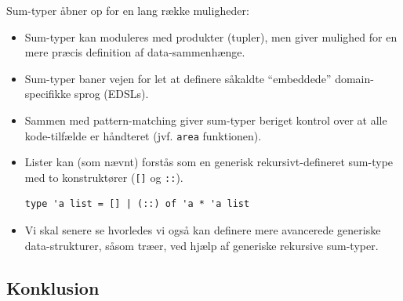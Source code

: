 \documentclass[rgb]{beamer}
\begin{document}
\begin{frame}[fragile]
\begin{footnotesize}

  \vspace{1ex}

  Sum-typer åbner op for en lang række muligheder:
  \vspace{1ex}
  \begin{itemize}
  \item Sum-typer kan moduleres med produkter (tupler), men giver
    mulighed for en mere præcis definition af data-sammenhænge.
  \vspace{1ex}
  \item Sum-typer baner vejen for let at definere såkaldte ``embeddede''
    domain-specifikke sprog (EDSLs).
  \vspace{1ex}
  \item Sammen med pattern-matching giver sum-typer beriget kontrol
    over at alle kode-tilfælde er håndteret (jvf. \lstinline{area} funktionen).
  \end{itemize}

  \vspace{1ex}

  \vspace{1ex}
  \begin{itemize}
  \item Lister kan (som nævnt) forstås som en generisk rekursivt-defineret sum-type med to konstruktører (\lstinline{[]} og \lstinline{::}).
\begin{lstlisting}[numbers=none,frame=none,mathescape]
  type 'a list = [] | (::) of 'a * 'a list
\end{lstlisting}
  \item Vi skal senere se hvorledes vi også kan definere mere avancerede generiske data-strukturer, såsom træer, ved hjælp af generiske rekursive sum-typer.
  \end{itemize}

\end{footnotesize}
\end{frame}

\subsection*{Konklusion}
\begin{frame}[fragile]

  \vspace{3mm}
  \tableofcontents
\end{frame}
\end{document}

